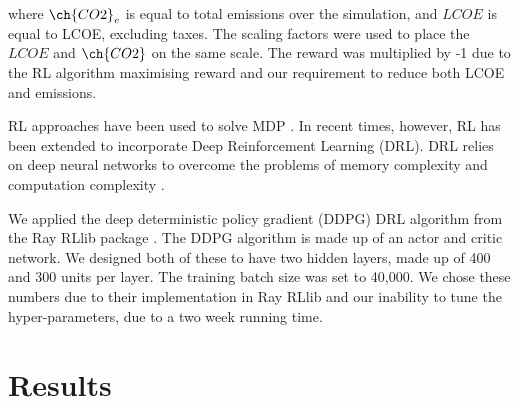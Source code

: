 \documentclass{article}
\begin{document}
where $\ch{CO2}_e$ is equal to total  emissions over the simulation, and $LCOE$ is equal to LCOE, excluding taxes. The scaling factors were used to place the $LCOE$ and $\ch{CO2}$ on the same scale. The reward was multiplied by -1 due to the RL algorithm maximising reward and our requirement to reduce both LCOE and  emissions.


RL approaches have been used to solve MDP \cite{Sutton2015}. In recent times, however, RL has been extended to incorporate Deep Reinforcement Learning (DRL). DRL relies on deep neural networks to overcome the problems of memory complexity and computation complexity \cite{Arulkumaran2017}. 

We applied the deep deterministic policy gradient (DDPG) DRL algorithm \cite{Hunt2016a} from the Ray RLlib package \cite{Liang2014}. The DDPG algorithm is made up of an actor and critic network. We designed both of these to have two hidden layers, made up of 400 and 300 units per layer. The training batch size was set to 40,000. We chose these numbers due to their implementation in Ray RLlib and our inability to tune the hyper-parameters, due to a two week running time.





%



\section{Results}
\label{sec:results}
\end{document}
